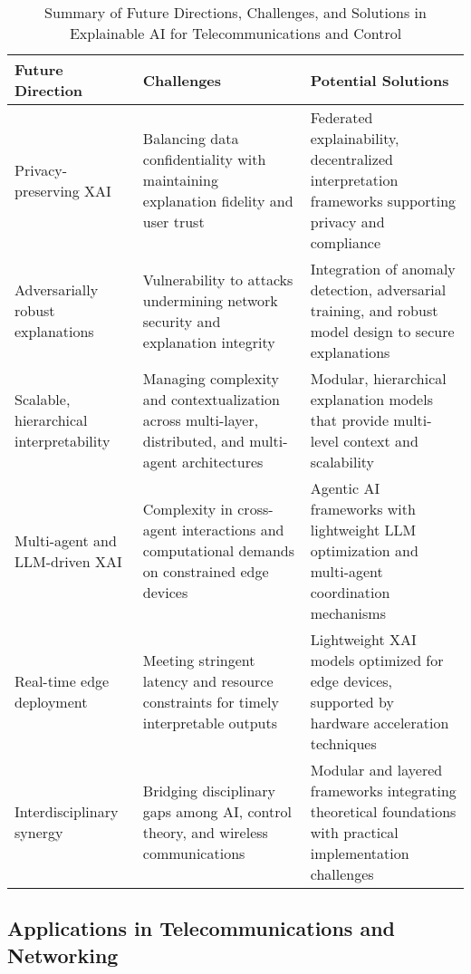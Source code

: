 \documentclass[sigconf]{acmart}
\begin{document}
\begin{table*}[htbp]
\centering
\caption{Summary of Future Directions, Challenges, and Solutions in Explainable AI for Telecommunications and Control}
\label{tab:future-directions}
\begin{adjustbox}{max width=\textwidth}
\begin{tabular}{@{}lll@{}}
\toprule
\textbf{Future Direction} & \textbf{Challenges} & \textbf{Potential Solutions} \\ \midrule
Privacy-preserving XAI & Balancing data confidentiality with maintaining explanation fidelity and user trust & Federated explainability, decentralized interpretation frameworks supporting privacy and compliance~\cite{ref48} \\[6pt]
Adversarially robust explanations & Vulnerability to attacks undermining network security and explanation integrity & Integration of anomaly detection, adversarial training, and robust model design to secure explanations~\cite{ref50, ref54} \\[6pt]
Scalable, hierarchical interpretability & Managing complexity and contextualization across multi-layer, distributed, and multi-agent architectures & Modular, hierarchical explanation models that provide multi-level context and scalability~\cite{ref55} \\[6pt]
Multi-agent and LLM-driven XAI & Complexity in cross-agent interactions and computational demands on constrained edge devices & Agentic AI frameworks with lightweight LLM optimization and multi-agent coordination mechanisms~\cite{ref55} \\[6pt]
Real-time edge deployment & Meeting stringent latency and resource constraints for timely interpretable outputs & Lightweight XAI models optimized for edge devices, supported by hardware acceleration techniques~\cite{ref54} \\[6pt]
Interdisciplinary synergy & Bridging disciplinary gaps among AI, control theory, and wireless communications & Modular and layered frameworks integrating theoretical foundations with practical implementation challenges \\ \bottomrule
\end{tabular}
\end{adjustbox}
\end{table*}

\subsection{Applications in Telecommunications and Networking}
\end{document}
